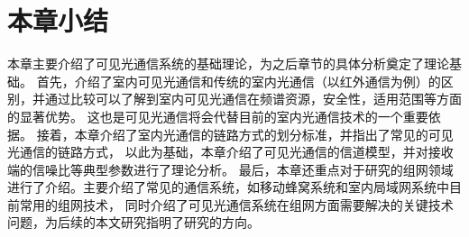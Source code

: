 \section{本章小结}
本章主要介绍了可见光通信系统的基础理论，为之后章节的具体分析奠定了理论基础。
首先，介绍了室内可见光通信和传统的室内光通信（以红外通信为例）的区别，并通过比较可以了解到室内可见光通信在频谱资源，安全性，适用范围等方面的显著优势。
这也是可见光通信将会代替目前的室内光通信技术的一个重要依据。
接着，本章介绍了室内光通信的链路方式的划分标准，并指出了常见的可见光通信的链路方式，
以此为基础，本章介绍了可见光通信的信道模型，并对接收端的信噪比等典型参数进行了理论分析。
最后，本章还重点对于研究的组网领域进行了介绍。主要介绍了常见的通信系统，如移动蜂窝系统和室内局域网系统中目前常用的组网技术，
同时介绍了可见光通信系统在组网方面需要解决的关键技术问题，为后续的本文研究指明了研究的方向。
